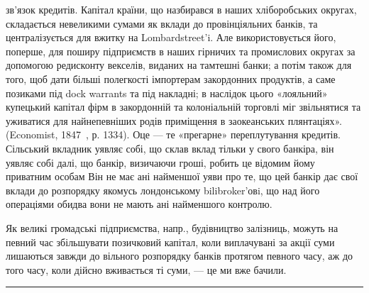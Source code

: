 зв’язок кредитів. Капітал країни, що назбирався в наших хліборобських
округах, складається невеликими сумами як вклади до провінціяльних банків,
та централізується для вжитку на Lombardstreet’i. Але використовується його,
поперше, для поширу підприємств в наших гірничих та промислових округах за
допомогою редисконту векселів, виданих на тамтешні банки; а потім також для того,
щоб дати більші полегкості імпортерам закордонних продуктів, а саме позиками
під dock warrants та під накладні; в наслідок цього «лояльний» купецький
капітал фірм в закордонній та колоніальній торговлі міг звільнятися та уживатися
для найнепевніших родів приміщення в заокеанських плянтаціях». (Economist,
1847~, р. 1334). Оце — те «прегарне» переплутування кредитів. Сільський
вкладник уявляє собі, що склав вклад тільки у свого банкіра, він уявляє собі
далі, що банкір, визичаючи гроші, робить це відомим йому приватним особам
Він не має ані найменшої уяви про те, що цей банкір дає свої вклади до розпорядку
якомусь лондонському bilibroker’овi, що над його операціями обидва
вони не мають ані найменшого контролю.

Як великі громадські підприємства, напр., будівництво залізниць, можуть
на певний час збільшувати позичковий капітал, коли виплачувані за акції
суми лишаються завжди до вільного розпорядку банків протягом певного часу,
аж до того часу, коли дійсно вживається ті суми, — це ми вже бачили.
\pfbreak
